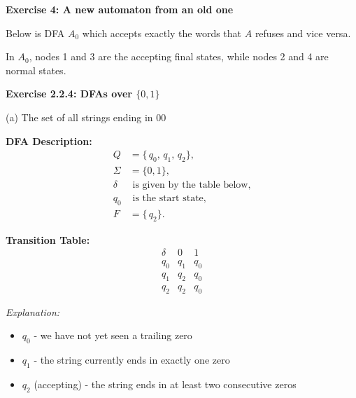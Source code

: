 \documentclass{article}
\theoremstyle{theorem}
\theoremstyle{definition}
\theoremstyle{remark}
\begin{document}
\textbf{Exercise 4: A new automaton from an old one}

Below is DFA $A_0$ which accepts exactly the words that $A$ refuses and vice versa.
\begin{center}
\end{center}
In $A_0$, nodes 1 and 3 are the accepting final states, while nodes 2 and 4 are normal states.

\textbf{Exercise 2.2.4: DFAs over $\{0,1\}$}

{(a) The set of all strings ending in 00}

\noindent
\textbf{DFA Description:}
\[
\begin{aligned}
Q &= \{\,q_0,\, q_1,\, q_2\},\\
\Sigma &= \{0,1\},\\
\delta &\text{ is given by the table below},\\
q_0 &\text{ is the start state},\\
F &= \{\,q_2\}.
\end{aligned}
\]

\noindent
\textbf{Transition Table:}
\[
\begin{array}{c|cc}
  \delta & 0 & 1 \\
\hline
  q_0    & q_1 & q_0 \\
  q_1    & q_2 & q_0 \\
  q_2    & q_2 & q_0
\end{array}
\]

\noindent
\textit{Explanation:} 
\begin{itemize}
\item $q_0$ - we have not yet seen a trailing zero
\item $q_1$ - the string currently ends in exactly one zero
\item $q_2$ (accepting) - the string ends in at least two consecutive zeros
\end{itemize}
\end{document}
